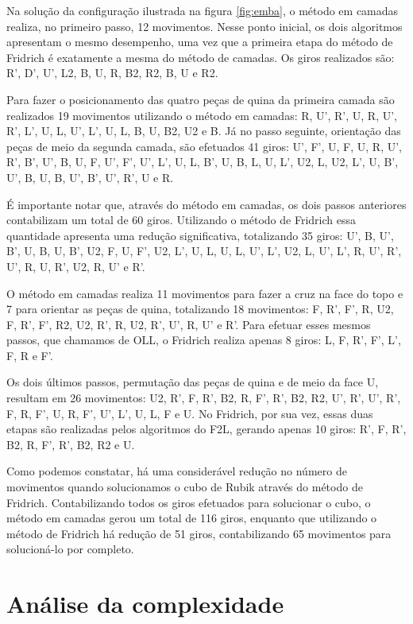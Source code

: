 Na solução da configuração ilustrada na figura \ref{fig:emba}, o método em camadas realiza, no primeiro passo, 12 movimentos. Nesse ponto inicial, os dois algoritmos apresentam o mesmo desempenho, uma vez que a primeira etapa do método de Fridrich é exatamente a mesma do método de camadas. Os giros realizados são: R’, D’, U’, L2, B, U, R, B2, R2, B, U e R2.


Para fazer o posicionamento das quatro peças de quina da primeira camada são realizados 19 movimentos utilizando o método em camadas: R, U’, R’, U, R, U’, R’, L’, U, L, U’, L’, U, L, B, U, B2, U2 e B. Já no passo seguinte, orientação das peças de meio da segunda camada, são efetuados 41 giros: U’, F’, U, F, U, R, U’, R’, B’, U’, B, U, F, U’, F’, U’, L’, U, L, B’, U, B, L, U, L’, U2, L, U2, L’, U, B’, U’, B, U, B, U’, B’, U’, R’, U e R.

É importante notar que, através do método em camadas, os dois passos anteriores contabilizam um total de 60 giros. Utilizando o método de Fridrich essa quantidade apresenta uma redução significativa, totalizando 35 giros: U’, B, U’, B’, U, B, U, B’, U2, F, U, F’, U2, L’, U, L, U, L, U’, L’, U2, L, U’, L’, R, U’, R’, U’, R, U, R’, U2, R, U’ e R’.

O método em camadas realiza 11 movimentos para fazer a cruz na face do topo e 7 para orientar as peças de quina, totalizando 18 movimentos: F, R’, F’, R, U2, F, R’, F’, R2, U2, R’, R, U2, R’, U’, R, U’ e R’. Para efetuar esses mesmos passos, que chamamos de OLL, o Fridrich realiza apenas 8 giros: L, F, R’, F’, L’, F, R e F’.

Os dois últimos passos, permutação das peças de quina e de meio da face U, resultam em 26 movimentos: U2, R’, F, R’, B2, R, F’, R’, B2, R2, U’, R’, U’, R’, F, R, F’, U, R, F’, U’, L’, U, L, F e U. No Fridrich, por sua vez, essas duas etapas são realizadas pelos algoritmos do F2L, gerando apenas 10 giros: R’, F, R’, B2, R, F’, R’, B2, R2 e U.

Como podemos constatar, há uma considerável redução no número de movimentos quando solucionamos o cubo de Rubik através do método de Fridrich. Contabilizando todos os giros efetuados para solucionar o cubo, o método em camadas gerou um total de 116 giros, enquanto que utilizando o método de Fridrich há redução de 51 giros, contabilizando 65 movimentos para solucioná-lo por completo.

\section{Análise da complexidade}

